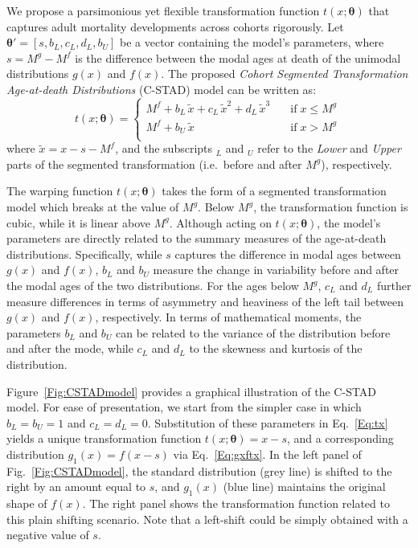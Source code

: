 \documentclass[11pt, a4paper]{article}
\begin{document}
We propose a parsimonious yet flexible transformation function $t(x;\bm{\theta})$ that captures adult mortality developments across cohorts rigorously. Let $\bm{\theta}' = \left[s,b_{L},c_{L},d_{L},b_{U}\right]$ be a vector containing the model's parameters, where $s = M^{g} - M^{f}$ is the difference between the modal ages at death of the unimodal distributions $g(x)$ and $f(x)$. The proposed \emph{Cohort Segmented Transformation Age-at-death Distributions} (C-STAD) model can be written as: 
%
\begin{equation}\label{Eq:tx}
t(x;\bm{\theta}) = \left\{ \begin{array}{ll}
M^{f} + b_{L}\,\tilde{x} + c_{L}\,\tilde{x}^2 + d_{L}\,\tilde{x}^3 \quad & \mathrm{if} \; x \leq M^{g} \, \\
M^{f} + b_{U}\,\tilde{x} \quad & \mathrm{if} \; x > M^{g} \\
\end{array}
\right.
\end{equation} 
%
where $\tilde{x}=x - s - M^{f}$, and the subscripts $_L$ and $_U$ refer to the \textit{Lower} and \textit{Upper} parts of the segmented transformation (i.e.~before and after $M^{g}$), respectively. \par

The warping function $t(x;\bm{\theta})$ takes the form of a segmented transformation model which breaks at the value of $M^{g}$. Below $M^{g}$, the transformation function is cubic, while it is linear above $M^{g}$. Although acting on $t(x;\bm{\theta})$, the model's parameters are directly related to the summary measures of the age-at-death distributions. Specifically, while $s$ captures the difference in modal ages between $g(x)$ and $f(x)$, $b_L$ and $b_U$ measure the change in variability before and after the modal ages of the two distributions. For the ages below $M^{g}$, $c_L$ and $d_L$ further measure differences in terms of asymmetry and heaviness of the left tail between $g(x)$ and $f(x)$, respectively. In terms of mathematical moments, the parameters $b_L$ and $b_U$ can be related to the variance of the distribution before and after the mode, while $c_L$ and $d_L$ to the skewness and kurtosis of the distribution. \par

Figure~\ref{Fig:CSTADmodel} provides a graphical illustration of the C-STAD model. For ease of presentation, we start from the simpler case in which $b_L = b_U = 1$ and $c_L = d_L = 0$. Substitution of these parameters in Eq.~\eqref{Eq:tx} yields a unique transformation function $t(x;\bm{\theta})=x-s$, and a corresponding distribution $g_1(x) = f(x-s)$ via Eq.~\eqref{Eq:gxftx}. In the left panel of Fig.~\ref{Fig:CSTADmodel}, the standard distribution (grey line) is shifted to the right by an amount equal to $s$, and $g_1(x)$ (blue line) maintains the original shape of $f(x)$. The right panel shows the transformation function related to this plain shifting scenario. Note that a left-shift could be simply obtained with a negative value of $s$. \par
\end{document}
